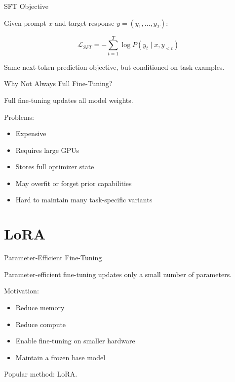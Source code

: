 \documentclass[aspectratio=169]{beamer}
\begin{document}
\begin{frame}{SFT Objective}

Given prompt $x$ and target response $y = (y_1,\ldots,y_T)$:

\[
\mathcal{L}_{SFT}
=
-
\sum_{t=1}^{T}
\log P(y_t \mid x, y_{<t})
\]

\vspace{0.5cm}

Same next-token prediction objective, but conditioned on task examples.

\end{frame}

\begin{frame}{Why Not Always Full Fine-Tuning?}

Full fine-tuning updates all model weights.

\vspace{0.5cm}

Problems:

\begin{itemize}
    \item Expensive
    \item Requires large GPUs
    \item Stores full optimizer state
    \item May overfit or forget prior capabilities
    \item Hard to maintain many task-specific variants
\end{itemize}

\end{frame}

\section{LoRA}

\begin{frame}{Parameter-Efficient Fine-Tuning}

Parameter-efficient fine-tuning updates only a small number of parameters.

\vspace{0.5cm}

Motivation:

\begin{itemize}
    \item Reduce memory
    \item Reduce compute
    \item Enable fine-tuning on smaller hardware
    \item Maintain a frozen base model
\end{itemize}

\vspace{0.5cm}

Popular method: LoRA.

\end{frame}
\end{document}
